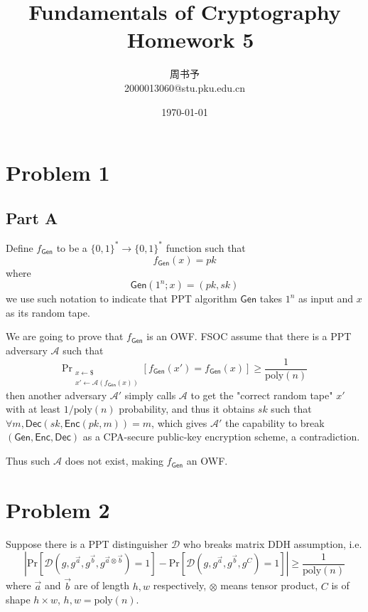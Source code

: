 \documentclass[8pt]{article}
\title{\heiti\zihao{1} Fundamentals  of Cryptography \ Homework 5}
\author{\kaishu\zihao{-3} 周书予\\2000013060@stu.pku.edu.cn}
\date{\today}
\theoremstyle{compact}
\def\ge{\geqslant}
\def\Pr#1{\text{Pr}\left[{#1}\right]}
\def\Enc{\textsf{Enc}}
\def\Dec{\textsf{Dec}}
\def\Gen{\textsf{Gen}}
\begin{document}
\large
{}
\pagestyle{plain}



\maketitle

\def\Gen{\textsf{Gen}}
\def\Enc{\textsf{Enc}}
\def\Dec{\textsf{Dec}}
\def\Pr{\text{Pr}}
\def\poly{\text{poly}}

\section*{Problem 1}
\subsection*{Part A}
Define $f_{\Gen}$ to be a $\{0, 1\}^* \to \{0, 1\}^*$ function such that $$f_{\Gen}(x) = pk$$ where $$\Gen(1^n; x) = (pk, sk)$$ we use such notation to indicate that PPT algorithm $\Gen$ takes $1^n$ as input and $x$ as its random tape.

We are going to prove that $f_{\Gen}$ is an OWF. FSOC assume that there is a PPT adversary $\mathcal A$ such that $$\Pr_{\substack{x \gets \$\\x' \gets \mathcal A(f_{\Gen}(x))}}\left[f_{\Gen}(x') = f_{\Gen}(x)\right] \ge \frac{1}{\poly(n)}$$ then another adversary $\mathcal A'$ simply calls $\mathcal A$ to get the "correct random tape" $x'$ with at least $1 / \poly(n)$ probability, and thus it obtains $sk$ such that $\forall m, \Dec(sk, \Enc(pk, m)) = m$, which gives $\mathcal A'$ the capability to break $(\Gen, \Enc, \Dec)$ as a CPA-secure public-key encryption scheme, a contradiction.

Thus such $\mathcal A$ does not exist, making $f_{\Gen}$ an OWF.

\section*{Problem 2}
Suppose there is a PPT distinguisher $\mathcal D$ who breaks matrix DDH assumption, i.e. $$\left| \Pr\left[\mathcal D(g, g^{\vec{a}}, g^{\vec{b}}, g^{\vec{a} \otimes \vec{b}}) = 1\right] - \Pr\left[\mathcal D(g, g^{\vec{a}}, g^{\vec{b}}, g^{C}) = 1\right] \right| \ge \frac{1}{\poly(n)}$$
where $\vec{a}$ and $\vec{b}$ are of length $h, w$ respectively, $\otimes$ means tensor product, $C$ is of shape $h \times w$, $h, w = \poly(n)$.
\end{document}
